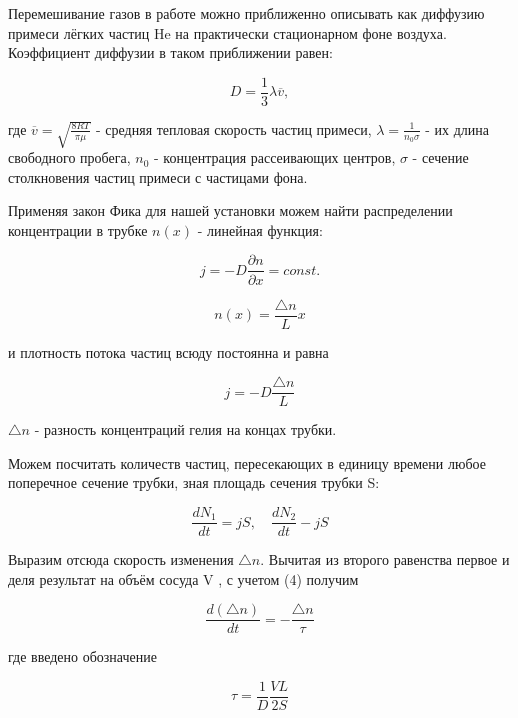 \documentclass[11pt]{article}
\begin{document}
Перемешивание газов в работе можно приближенно описывать как диффузию примеси лёгких частиц He на практически стационарном фоне воздуха. Коэффициент диффузии в таком приближении равен:

\begin{equation}
D = \frac{1}{3} \lambda \overline{v},
\end{equation}

где $\overline{v} = \sqrt{\frac{8RT}{\pi \mu}}$ - средняя тепловая скорость частиц примеси, $\lambda = \frac{1}{n_0 \sigma}$ - их длина свободного пробега, $n_0$ - концентрация рассеивающих центров, $\sigma$ - сечение столкновения частиц примеси с частицами фона.

\vspace{0.5cm}

Применяя закон Фика для нашей установки можем найти распределении концентрации в трубке $n(x)$ - линейная функция:

\[j = - D \frac{\partial n}{\partial x} = const.\]

\begin{equation}
n(x) = \frac{\bigtriangleup n}{L} x
\end{equation}

и плотность потока частиц всюду постоянна и равна

\begin{equation}
j = -D \frac{\bigtriangleup n}{L}
\end{equation}

$\bigtriangleup n$ - разность концентраций гелия на концах трубки.

Можем посчитать количеств частиц, пересекающих в единицу времени любое поперечное сечение трубки, зная площадь сечения трубки S:

\begin{equation}
\frac{dN_1}{dt} = jS, \quad \frac{dN_2}{dt} - jS
\end{equation}

Выразим отсюда скорость изменения $\bigtriangleup n$. Вычитая из второго равенства
первое и деля результат на объём сосуда V , с учетом (4) получим

\begin{equation}
\frac{d (\bigtriangleup n)}{dt} = - \frac{\bigtriangleup n}{\tau}
\end{equation}

где введено обозначение

\begin{equation}
\tau = \frac{1}{D} \frac{VL}{2 S}
\end{equation}
\end{document}

